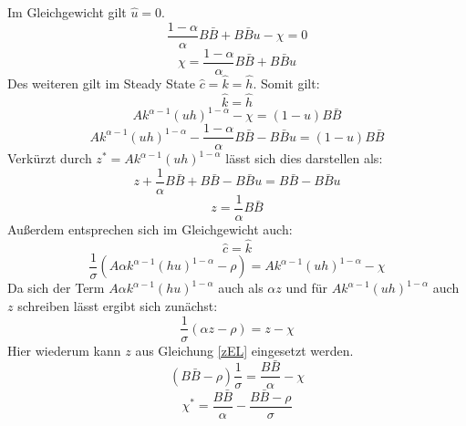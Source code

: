 Im Gleichgewicht gilt $\hat{u}=0$.
\begin{equation}
\frac{1- \alpha}{\alpha} B \bar{B} + B \bar{B} u - \chi =0
\end{equation}
\vspace{-0.7cm}
\begin{equation}
\chi = \frac{1- \alpha}{\alpha} B \bar{B} + B \bar{B} u\label{ci1EL}
\end{equation}
Des weiteren gilt im Steady State $\hat{c}=\hat{k}=\hat{h}$.
Somit gilt:
\begin{equation}
\hat{k} = \hat{h}
\end{equation}
\begin{equation}
Ak^{\alpha -1} (uh)^{1- \alpha} - \chi = (1- u) B\bar{B}
\end{equation}
\vspace{-0.5cm}
\begin{equation}
Ak^{\alpha -1} (uh)^{1- \alpha} - \frac{1- \alpha}{\alpha}B \bar{B} - B \bar{B}u  = (1- u) B\bar{B}
\end{equation}
Verkürzt durch $z^*=Ak^{\alpha -1} (uh)^{1- \alpha}$ lässt sich dies darstellen als:
\begin{equation}
z + \frac{1}{\alpha}B \bar{B} + B\bar{B}- B \bar{B}u  =  B\bar{B} - B \bar{B} u
\end{equation}
\begin{equation}
\boxed{z = \frac{1}{\alpha} B \bar{B}}\label{zEL}
\end{equation}
Au{\ss}erdem entsprechen sich im Gleichgewicht auch: 
\begin{equation}
\hat{c}= \hat{k}
\end{equation}
\begin{equation}
\frac{1}{\sigma}(A\alpha k^{\alpha -1} (hu)^{1- \alpha}- \rho) = Ak^{\alpha -1} (uh)^{1- \alpha}- \chi
\end{equation}
Da sich der Term $A\alpha k^{\alpha -1} (hu)^{1- \alpha}$ auch als $\alpha z$ und für $Ak^{\alpha -1} (uh)^{1- \alpha}$ auch $z$ schreiben lässt ergibt sich zunächst:
\begin{equation}
\frac{1}{\sigma}(\alpha z- \rho) = z - \chi
\end{equation}
Hier wiederum kann $z$ aus Gleichung \eqref{zEL} eingesetzt werden. 
\begin{equation}
(B \bar{B} - \rho) \frac{1}{\sigma} = \frac{B \bar{B}}{\alpha} - \chi
\end{equation}
\begin{equation}
\boxed{\chi^* = \frac{B \bar{B}}{\alpha}- \frac{B \bar{B}- \rho}{\sigma}\label{chi2EL}}
\end{equation}
